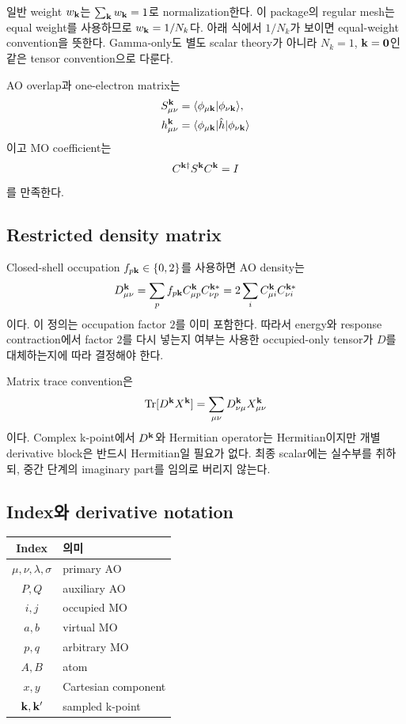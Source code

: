 일반 weight $w_{\mathbf{k}}$는 $\sum_{\mathbf{k}} w_{\mathbf{k}}=1$로 normalization한다. 이 package의 regular
mesh는 equal weight를 사용하므로 $w_{\mathbf{k}}=1/N_k$다. 아래 식에서 $1/N_k$가 보이면
equal-weight convention을 뜻한다. Gamma-only도 별도 scalar theory가 아니라
$N_k=1$, $\mathbf{k}=\mathbf0$인 같은 tensor convention으로 다룬다.

AO overlap과 one-electron matrix는
\begin{align}
  S_{\mu\nu}^{\mathbf{k}}
  &=\langle\phi_{\mu\mathbf{k}}|\phi_{\nu\mathbf{k}}\rangle,\\
  h_{\mu\nu}^{\mathbf{k}}
  &=\langle\phi_{\mu\mathbf{k}}|\hat h|\phi_{\nu\mathbf{k}}\rangle
  \label{eq:ao-matrices}
\end{align}
이고 MO coefficient는
\begin{equation}
  C^{\mathbf{k}\dagger}S^{\mathbf{k}}C^{\mathbf{k}}=I
  \label{eq:mo-orthonormality}
\end{equation}
를 만족한다.

\subsection{Restricted density matrix}

Closed-shell occupation $f_{p\mathbf{k}}\in\{0,2\}$를 사용하면 AO density는
\begin{equation}
  D_{\mu\nu}^{\mathbf{k}}
  =\sum_p f_{p\mathbf{k}}C_{\mu p}^{\mathbf{k}}C_{\nu p}^{\mathbf{k} *}
  =2\sum_i C_{\mu i}^{\mathbf{k}}C_{\nu i}^{\mathbf{k} *}
  \label{eq:restricted-density}
\end{equation}
이다. 이 정의는 occupation factor $2$를 이미 포함한다. 따라서 energy와 response
contraction에서 factor $2$를 다시 넣는지 여부는 사용한 occupied-only tensor가
$D$를 대체하는지에 따라 결정해야 한다.

Matrix trace convention은
\begin{equation}
  \operatorname{Tr}[D^{\mathbf{k}}X^{\mathbf{k}}]
  =\sum_{\mu\nu}D_{\nu\mu}^{\mathbf{k}}X_{\mu\nu}^{\mathbf{k}}
  \label{eq:trace-convention}
\end{equation}
이다. Complex k-point에서 $D^{\mathbf{k}}$와 Hermitian operator는 Hermitian이지만 개별
derivative block은 반드시 Hermitian일 필요가 없다. 최종 scalar에는 실수부를 취하되,
중간 단계의 imaginary part를 임의로 버리지 않는다.

\subsection{Index와 derivative notation}

\begin{center}
\begin{tabular}{cl}
\toprule
Index & 의미 \\
\midrule
$\mu,\nu,\lambda,\sigma$ & primary AO \\
$P,Q$ & auxiliary AO \\
$i,j$ & occupied MO \\
$a,b$ & virtual MO \\
$p,q$ & arbitrary MO \\
$A,B$ & atom \\
$x,y$ & Cartesian component \\
$\mathbf{k},\mathbf{k}'$ & sampled k-point \\
\bottomrule
\end{tabular}
\end{center}

